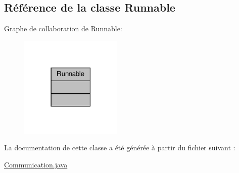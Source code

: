 \hypertarget{class_runnable}{}\subsection{Référence de la classe Runnable}
\label{class_runnable}


Graphe de collaboration de Runnable\+:\nopagebreak
\begin{figure}[H]
\begin{center}
\leavevmode
\includegraphics[width=138pt]{class_runnable__coll__graph}
\end{center}
\end{figure}


La documentation de cette classe a été générée à partir du fichier suivant \+:\begin{DoxyCompactItemize}
\item 
\hyperlink{_communication_8java}{Communication.\+java}\end{DoxyCompactItemize}
